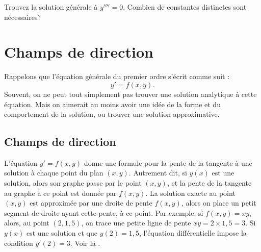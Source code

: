 \begin{exercise}
	Trouvez la solution générale à $y''''= 0$.  Combien de constantes distinctes sont nécessaires?
\end{exercise}


\sectionnewpage
\section{Champs de direction}
\label{slopefields:section}


%

Rappelons que l'équation générale du premier ordre s'écrit comme suit :
\begin{equation*}
	y' = f(x , y).
\end{equation*}
Souvent, on ne peut tout simplement pas trouver une solution analytique à cette équation.
Mais on aimerait au moins avoir une idée de la forme et du comportement de la solution, ou trouver une solution approximative.



\subsection{Champs de direction}

L'équation $y' = f(x , y)$ donne une formule pour la pente de la tangente à une solution à chaque point du plan $(x , y)$.
Autrement dit, si $y(x)$ est une solution, alors son graphe passe par le point $(x , y)$,
et la pente de la tangente au graphe à ce point est donnée par $f(x , y)$.
La solution exacte au point $(x , y)$ est approximée par une droite de pente $f(x , y)$,
alors on place un petit segment de droite ayant cette pente, à ce point.
%
Par exemple, si $f(x , y) = xy$, alors, au point $(2 , 1,5)$, on trace une petite ligne de pente $xy = 2 \times 1,5 = 3$.
Si $y(x)$ est une solution et que $y(2) = 1,5$, l'équation différentielle impose la condition $y'(2) = 3$.
Voir la .

